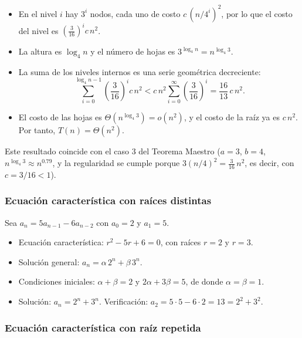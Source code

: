 \documentclass{article}
\begin{document}
        \begin{itemize}
        \item En el nivel $i$ hay $3^i$ nodos, cada uno de costo $c\,(n/4^i)^2$, por
                lo que el costo del nivel es $\left(\tfrac{3}{16}\right)^{i} c\,n^2$.
        \item La altura es $\log_4 n$ y el número de hojas es
                $3^{\log_4 n} = n^{\log_4 3}$.
        \item La suma de los niveles internos es una serie geométrica decreciente:
                \[
                \sum_{i=0}^{\log_4 n - 1}\left(\frac{3}{16}\right)^{i} c\,n^2
                < c\,n^2\sum_{i=0}^{\infty}\left(\frac{3}{16}\right)^{i}
                = \frac{16}{13}\,c\,n^2.
                \]
        \item El costo de las hojas es $\Theta\!\left(n^{\log_4 3}\right) = o(n^2)$,
                y el costo de la raíz ya es $c\,n^2$. Por tanto, $T(n) = \Theta(n^2)$.
        \end{itemize}
        
        Este resultado coincide con el caso 3 del Teorema Maestro
        ($a=3$, $b=4$, $n^{\log_4 3}\approx n^{0.79}$, y la regularidad se cumple
        porque $3(n/4)^2 = \tfrac{3}{16}\,n^2$, es decir, con $c = 3/16 < 1$).
        
        \subsubsection{Ecuación característica con raíces distintas}
        
        Sea $a_n = 5a_{n-1} - 6a_{n-2}$ con $a_0 = 2$ y $a_1 = 5$.
        
        \begin{itemize}
        \item Ecuación característica: $r^2 - 5r + 6 = 0$, con raíces $r = 2$ y
                $r = 3$.
        \item Solución general: $a_n = \alpha\,2^n + \beta\,3^n$.
        \item Condiciones iniciales: $\alpha + \beta = 2$ y $2\alpha + 3\beta = 5$,
                de donde $\alpha = \beta = 1$.
        \item Solución: $a_n = 2^n + 3^n$. Verificación: $a_2 = 5\cdot 5 - 6\cdot 2 = 13 = 2^2 + 3^2$.
        \end{itemize}
        
        \subsubsection{Ecuación característica con raíz repetida}
        
\end{document}
